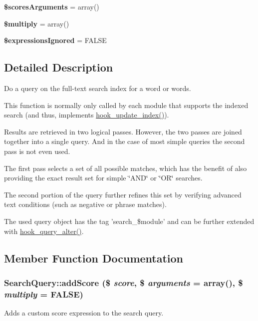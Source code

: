 \begin{DoxyCompactItemize}
\item 
\hypertarget{classSearchQuery_a66c9cfd32ac9541cfd2e87034098b475}{
{\bfseries \$scoresArguments} = array()}
\label{classSearchQuery_a66c9cfd32ac9541cfd2e87034098b475}

\item 
\hypertarget{classSearchQuery_a2d0be8480223985157ed08505a03e7d4}{
{\bfseries \$multiply} = array()}
\label{classSearchQuery_a2d0be8480223985157ed08505a03e7d4}

\item 
\hypertarget{classSearchQuery_a17e47ab267e1cff78c3f2f036692818c}{
{\bfseries \$expressionsIgnored} = FALSE}
\label{classSearchQuery_a17e47ab267e1cff78c3f2f036692818c}

\end{DoxyCompactItemize}


\subsection{Detailed Description}
Do a query on the full-\/text search index for a word or words.

This function is normally only called by each module that supports the indexed search (and thus, implements \hyperlink{group__search_ga23d6f6642bd53c4f033f10e9c1b12d43}{hook\_\-update\_\-index()}).

Results are retrieved in two logical passes. However, the two passes are joined together into a single query. And in the case of most simple queries the second pass is not even used.

The first pass selects a set of all possible matches, which has the benefit of also providing the exact result set for simple \char`\"{}AND\char`\"{} or \char`\"{}OR\char`\"{} searches.

The second portion of the query further refines this set by verifying advanced text conditions (such as negative or phrase matches).

The used query object has the tag 'search\_\-\$module' and can be further extended with \hyperlink{group__hooks_gaf166f6375e9f7b5919d719eb91198d47}{hook\_\-query\_\-alter()}. 

\subsection{Member Function Documentation}
\hypertarget{classSearchQuery_a72dc185ab8034f0979d877b6b9c57b1c}{
\subsubsection[{addScore}]{\setlength{\rightskip}{0pt plus 5cm}SearchQuery::addScore (\$ {\em score}, \/  \$ {\em arguments} = {\ttfamily array()}, \/  \$ {\em multiply} = {\ttfamily FALSE})}}
\label{classSearchQuery_a72dc185ab8034f0979d877b6b9c57b1c}
Adds a custom score expression to the search query.

